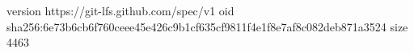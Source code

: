 version https://git-lfs.github.com/spec/v1
oid sha256:6e73b6cb6f760ceee45e426c9b1cf635cf9811f4e1f8e7af8c082deb871a3524
size 4463
